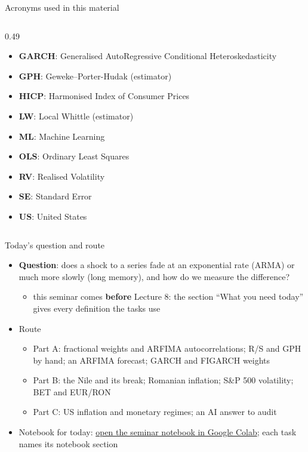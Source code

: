 \begin{frame}{Acronyms used in this material}
\begin{columns}[T]
\begin{column}{0.49\textwidth}
\begin{itemize}
    \item \textbf{GARCH}: Generalised AutoRegressive Conditional Heteroskedasticity
    \item \textbf{GPH}: Geweke–Porter-Hudak (estimator)
    \item \textbf{HICP}: Harmonised Index of Consumer Prices
    \item \textbf{LW}: Local Whittle (estimator)
    \item \textbf{ML}: Machine Learning
    \item \textbf{OLS}: Ordinary Least Squares
    \item \textbf{RV}: Realised Volatility
    \item \textbf{SE}: Standard Error
    \item \textbf{US}: United States
\end{itemize}
\end{column}
\end{columns}
\end{frame}

\begin{frame}{Today's question and route}
\itemsize{\small}
\begin{itemize}
    \item \textbf{Question}: does a shock to a series fade at an exponential rate (ARMA) or much more slowly (long memory), and how do we measure the difference?
    \begin{itemize}
        \item this seminar comes \textbf{before} Lecture 8: the section ``What you need today'' gives every definition the tasks use
    \end{itemize}
    \item Route
    \begin{itemize}
        \item Part A: fractional weights and ARFIMA autocorrelations; R/S and GPH by hand; an ARFIMA forecast; GARCH and FIGARCH weights
        \item Part B: the Nile and its break; Romanian inflation; S\&P 500 volatility; BET and EUR/RON
        \item Part C: US inflation and monetary regimes; an AI answer to audit
    \end{itemize}
    \item Notebook for today: \href{\nb}{open the seminar notebook in Google Colab}; each task names its notebook section
\end{itemize}
\end{frame}

